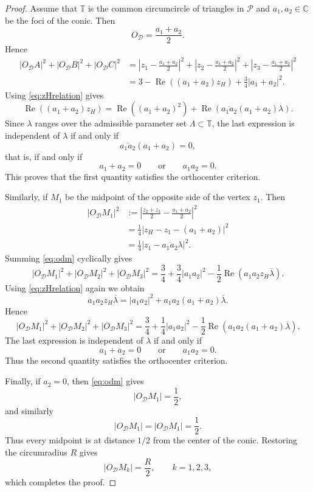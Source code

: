 \documentclass[10pt,a4paper]{amsart}
\begin{document}
\begin{proof}
Assume that $\mathbb T$ is the common circumcircle of triangles in $\mathcal P$ and $a_1,a_2 \in \mathbb C$ be the foci of the conic. Then
\[
O_{\mathcal D}=\frac{a_1+a_2}{2}.
\]
Hence
\begin{align*}
|O_{\mathcal D}A|^2+|O_{\mathcal D}B|^2+|O_{\mathcal D}C|^2
&=\left|
z_1-\frac{a_1+a_2}{2}
\right|^2+\left|
z_2-\frac{a_1+a_2}{2}
\right|^2+\left|
z_3-\frac{a_1+a_2}{2}
\right|^2 \\
&=
3-\operatorname{Re}((a_1+a_2)z_H)+\frac34
|a_1+a_2|^2.
\end{align*}
Using \eqref{eq:zHrelation} gives
\[
\operatorname{Re}((a_1+a_2)z_H)=\operatorname{Re}((a_1+a_2)^2)+\operatorname{Re}(\overline{a_1a_2}(a_1+a_2)\lambda).
\]
Since $\lambda$ ranges over the admissible parameter set $\Lambda \subset \mathbb T$, the last expression is independent of $\lambda$ if and only if
\[
\overline{a_1a_2}(a_1+a_2)=0,
\]
that is, if and only if
\[
a_1+a_2=0
\qquad\text{or}\qquad
a_1a_2=0.
\]
This proves that the first quantity satisfies the orthocenter criterion.

Similarly, if $M_1$ be the midpoint of the opposite side of the vertex $z_1$. Then
\begin{align}
|O_{\mathcal D}M_1|^2
&:=\left|
\frac{z_2+z_3}{2}-\frac{a_1+a_2}{2}
\right|^2 \nonumber \\
&=
\frac14\left|z_H-z_1-(a_1+a_2)\right|^2  \nonumber\\
&=
\frac14\left|z_1-\overline{a_1a_2} \lambda\right|^2 \label{eq:odm}.
\end{align}
Summing \eqref{eq:odm} cyclically gives
\[
|O_{\mathcal D}M_1|^2+|O_{\mathcal D}M_2|^2+|O_{\mathcal D}M_3|^2
=
\frac34+\frac34|a_1a_2|^2
-\frac12
\operatorname{Re}
\left(
a_1a_2z_H\overline{\lambda}
\right).
\]
Using \eqref{eq:zHrelation} again we obtain
\[
a_1a_2z_H\overline{\lambda}
=
|a_1a_2|^2
+
a_1a_2(a_1+a_2)\overline{\lambda}.
\]
Hence
\[
|O_{\mathcal D}M_1|^2+|O_{\mathcal D}M_2|^2+|O_{\mathcal D}M_3|^2
=
\frac34+\frac14|a_1a_2|^2
-\frac12
\operatorname{Re}
\left(
a_1a_2(a_1+a_2)\overline{\lambda}
\right).
\]
The last expression is independent of $\lambda$ if and only if
\[
a_1+a_2=0
\qquad\text{or}\qquad
a_1a_2=0.
\] 
Thus the second quantity satisfies the orthocenter criterion.

Finally, if $a_2=0$, then \eqref{eq:odm} gives
\[
|O_{\mathcal D}M_1|
=
\frac12,
\]
and similarly
\[
|O_{\mathcal D}M_1|=|O_{\mathcal D}M_1|=\frac12.
\]
Thus every midpoint is at distance $1/2$ from the center of the conic. Restoring the circumradius $R$ gives
\[
|O_{\mathcal D}M_k|=\frac{R}{2},
\qquad k=1,2,3,
\]
which completes the proof.
\end{proof}
\end{document}
